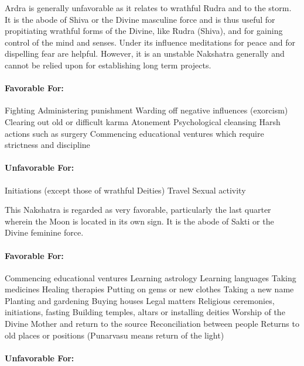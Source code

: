 
Ardra is generally unfavorable as it relates to wrathful Rudra and to the storm. It is the abode of Shiva or the Divine masculine force and is thus useful for propitiating wrathful forms of the Divine, like Rudra (Shiva), and for gaining control of the mind and senses. Under its influence meditations for peace and for dispelling fear are helpful. However, it is an unstable Nakshatra generally and cannot be relied upon for establishing long term projects.

 

\paragraph{Favorable For:}

Fighting
Administering punishment
Warding off negative influences (exorcism)
Clearing out old or difficult karma
Atonement
Psychological cleansing
Harsh actions such as surgery
Commencing educational ventures which require strictness and discipline
 

\paragraph{Unfavorable For:}

Initiations (except those of wrathful Deities)
Travel
Sexual activity
 


This Nakshatra is regarded as very favorable, particularly the last quarter wherein the Moon is located in its own sign. It is the abode of Sakti or the Divine feminine force.

 

\paragraph{Favorable For:}

Commencing educational ventures
Learning astrology
Learning languages
Taking medicines
Healing therapies
Putting on gems or new clothes
Taking a new name
Planting and gardening
Buying houses
Legal matters
Religious ceremonies, initiations, fasting
Building temples, altars or installing deities
Worship of the Divine Mother and return to the source
Reconciliation between people
Returns to old places or positions (Punarvasu means return of the light)
 

\paragraph{Unfavorable For:}


